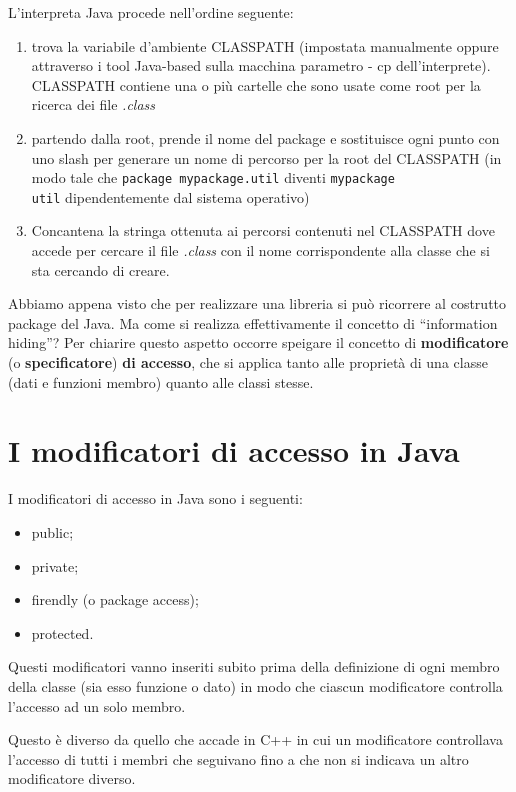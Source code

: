 \documentclass[12pt]{report}
\begin{document}
L'interpreta Java procede nell'ordine seguente:
\begin{enumerate}
	\item trova la variabile d'ambiente CLASSPATH (impostata manualmente oppure attraverso i tool Java-based sulla macchina parametro - cp dell'interprete). CLASSPATH contiene una o più cartelle che sono usate come root per la ricerca dei file \textit{.class}
	\item partendo dalla root, prende il nome del package e sostituisce ogni punto con uno slash per generare un nome di percorso per la root del CLASSPATH (in modo tale che \texttt{package mypackage.util} diventi \texttt{mypackage\\util} dipendentemente dal sistema operativo)
	\item Concantena la stringa ottenuta ai percorsi contenuti nel CLASSPATH dove accede per cercare il file \textit{.class} con il nome corrispondente alla classe che si sta cercando di creare.
\end{enumerate}
	Abbiamo appena visto che per realizzare una libreria si può ricorrere al costrutto package del Java. Ma come si realizza effettivamente il concetto di ``information hiding''? Per chiarire questo aspetto occorre speigare il concetto di \textbf{modificatore} (o \textbf{specificatore}) \textbf{di accesso}, che si applica tanto alle proprietà di una classe (dati e funzioni membro) quanto alle classi stesse.
\section{I modificatori di accesso in Java}
I modificatori di accesso in Java sono i seguenti:
\begin{itemize}
	\item public;
	\item private;
	\item firendly (o package access);
	\item protected.
\end{itemize}
Questi modificatori vanno inseriti subito prima della definizione di ogni membro della classe (sia esso funzione o dato) in modo che ciascun modificatore controlla l'accesso ad un solo membro.

Questo è diverso da quello che accade in C++ in cui un modificatore controllava l'accesso di tutti i membri che seguivano fino a che non si indicava un altro modificatore diverso.
\end{document}
